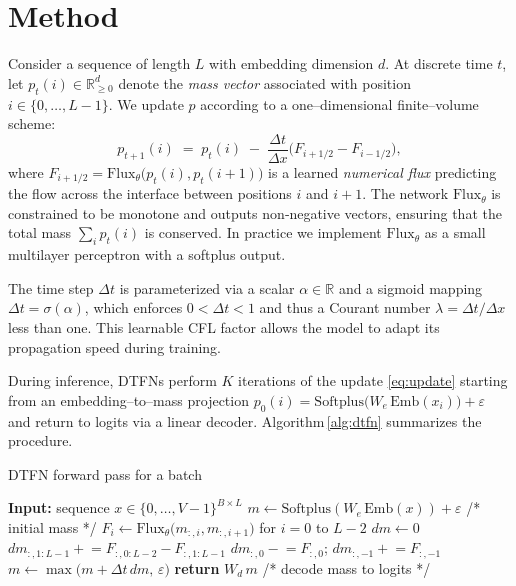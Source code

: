 \documentclass[10pt]{article}
\begin{document}
\section{Method}
Consider a sequence of length $L$ with embedding dimension $d$. At discrete
time $t$, let $p_t(i)\in \mathbb{R}^d_{\geq 0}$ denote the \emph{mass vector}
associated with position $i\in\{0,\dots,L-1\}$. We update $p$ according to a
one–dimensional finite–volume scheme:
\begin{equation}
    p_{t+1}(i) \;=\; p_t(i) \; - \; \frac{\Delta t}{\Delta x}
    \bigl(F_{i+1/2} - F_{i-1/2}\bigr),
    \label{eq:update}
\end{equation}
where $F_{i+1/2} = \mathrm{Flux}_\theta\bigl(p_t(i), p_t(i+1)\bigr)$ is a
learned \emph{numerical flux} predicting the flow across the interface between
positions $i$ and $i+1$. The network $\mathrm{Flux}_\theta$ is constrained to
be monotone and outputs non‑negative vectors, ensuring that the total mass
$\sum_i p_t(i)$ is conserved. In practice we implement $\mathrm{Flux}_\theta$
as a small multilayer perceptron with a softplus output.

The time step $\Delta t$ is parameterized via a scalar $\alpha\in\mathbb{R}$
and a sigmoid mapping $\Delta t = \sigma(\alpha)$, which enforces
$0<\Delta t<1$ and thus a Courant number $\lambda=\Delta t/\Delta x$ less
than one. This learnable CFL factor allows the model to adapt its propagation
speed during training.

During inference, DTFNs perform $K$ iterations of the update
\eqref{eq:update} starting from an embedding–to–mass projection $p_0(i) =
\mathrm{Softplus}\bigl(W_e\,\mathrm{Emb}(x_i)\bigr) + \varepsilon$ and
return to logits via a linear decoder. Algorithm\,\ref{alg:dtfn} summarizes
the procedure.

\begin{algorithm}[t]
    \caption{DTFN forward pass for a batch}
    \label{alg:dtfn}
    \begin{algorithmic}[1]
        \STATE \textbf{Input:} sequence $x\in \{0,\dots,V-1\}^{B\times L}$
        \STATE $m \leftarrow \mathrm{Softplus}(W_e\,\mathrm{Emb}(x)) + \varepsilon$ \hfill/* initial mass */
            \STATE $F_i \leftarrow \mathrm{Flux}_\theta\bigl(m_{:,i}, m_{:,i+1}\bigr)$ for $i=0$ to $L-2$
            \STATE $dm \leftarrow 0$
            \STATE $dm_{:,1:L-1} \mathrel{+}= F_{:,0:L-2} - F_{:,1:L-1}$
            \STATE $dm_{:,0} \mathrel{-}= F_{:,0}$; \quad $dm_{:,-1} \mathrel{+}= F_{:,-1}$
            \STATE $m \leftarrow \max\bigl(m + \Delta t\, dm,\,\varepsilon\bigr)$
        \ENDFOR
        \STATE \textbf{return} $W_d\,m$ \hfill/* decode mass to logits */
    \end{algorithmic}
\end{algorithm}
\end{document}
